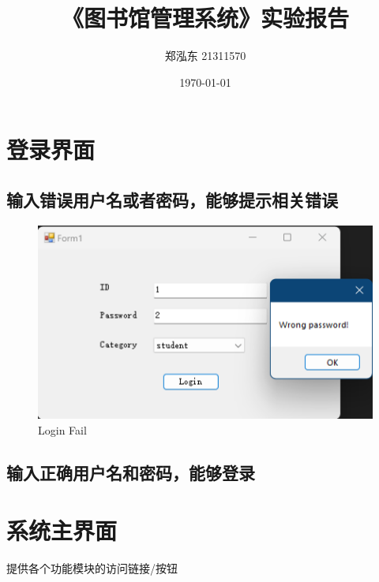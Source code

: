 \documentclass{article}
\begin{document}
\sloppy %

\title{《图书馆管理系统》实验报告}
\author{郑泓东 21311570}
\date{\today}

\maketitle

\section{登录界面}

\subsection{输入错误用户名或者密码，能够提示相关错误}

\begin{figure}[H]
    \centering
    \includegraphics[width=1\textwidth]{../pic/login_fail.png}
    \caption{Login Fail}
    \label{fig:login_fail}
\end{figure}

\subsection{输入正确用户名和密码，能够登录}

\section{系统主界面}
提供各个功能模块的访问链接/按钮
\end{document}
